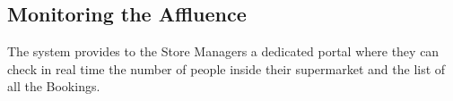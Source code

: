 \subsection{Monitoring the Affluence}

The system provides to the Store Managers a dedicated portal where they can check in real time the number of people inside their supermarket and the list of all the Bookings.